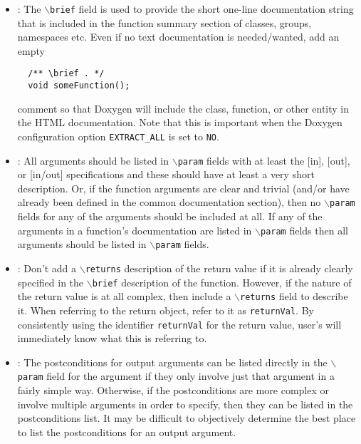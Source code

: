 \begin{itemize}
{}\item\DOXAddBrief: The {}\texttt{$\backslash$brief} field is used to provide
the short one-line documentation string that is included in the function
summary section of classes, groups, namespaces etc.  Even if no text
documentation is needed/wanted, add an empty
%
{\small\begin{verbatim}
  /** \brief . */
  void someFunction();
\end{verbatim}}
%
comment so that Doxygen will include the class, function, or other entity in
the HTML documentation.  Note that this is important when the Doxygen
configuration option {}\texttt{EXTRACT\-\_ALL} is set to {}\texttt{NO}.


{}\item\DOXAllOrNoneParam: All arguments should be listed in
{}\texttt{$\backslash$param} fields with at least the [in], [out], or [in/out]
specifications and these should have at least a very short description.  Or,
if the function arguments are clear and trivial (and/or have already been
defined in the common documentation section), then no
{}\texttt{$\backslash$param} fields for any of the arguments should be
included at all.  If any of the arguments in a function's documentation are
listed in {}\texttt{$\backslash$param} fields then all arguments should be
listed in {}\texttt{$\backslash$param} fields.


{}\item\DOXReturnsOnlyIfNeeded: Don't add a {}\texttt{$\backslash$returns}
description of the return value if it is already clearly specified in the
{}\texttt{$\backslash$brief} description of the function.  However, if the
nature of the return value is at all complex, then include a
{}\texttt{$\backslash$returns} field to describe it.  When referring to the
return object, refer to it as {}\texttt{returnVal}.  By consistently using the
identifier {}\texttt{returnVal} for the return value, user's will immediately
know what this is referring to.


{}\item\DOXPreferPostconditionsInParam: The postconditions for output
arguments can be listed directly in the {}\texttt{$\backslash$param} field for
the argument if they only involve just that argument in a fairly simple way.
Otherwise, if the postconditions are more complex or involve multiple
arguments in order to specify, then they can be listed in the postconditions
list.  It may be difficult to objectively determine the best place to list the
postconditions for an output argument.



\end{itemize}
